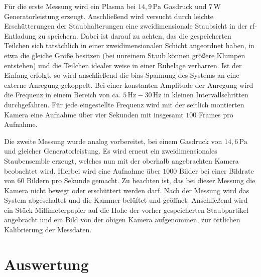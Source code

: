 \documentclass[numbers=noenddot,a4paper,notitlepage,twoside,BCOR15mm]{scrartcl}
\begin{document}
	Für die erste Messung wird ein Plasma bei $14,9\,\mathrm{Pa}$ Gasdruck und $7\,\mathrm{W}$ Generatorleistung erzeugt. Anschließend wird versucht durch leichte Erschütterungen der Staubhalterungen eine zweidimensionale Staubsicht in der rf-Entladung zu speichern. Dabei ist darauf zu achten, das die gespeicherten Teilchen sich tatsächlich in einer zweidimensionalen Schicht angeordnet haben, in etwa die gleiche Größe besitzen (bei unreinem Staub können größere Klumpen entstehen) und die Teilchen idealer weise in einer Ruhelage verharren. Ist der Einfang erfolgt, so wird anschließend die bias-Spannung des Systems an eine externe Anregung gekoppelt. Bei einer konstanten Amplitude der Anregung wird die Frequenz in einem Bereich von ca. $5\,\mathrm{Hz} - 30\,\mathrm{Hz}$ in kleinen Intervallschritten durchgefahren. Für jede eingestellte Frequenz wird mit der seitlich montierten Kamera eine Aufnahme über vier Sekunden mit insgesamt $100$ Frames pro Aufnahme. 
	
	Die zweite Messung wurde analog vorbereitet, bei einem Gasdruck von $14,6\,\mathrm{Pa}$ und gleicher Generatorleistung. Es wird erneut ein zweidimensionales Staubensemble erzeugt, welches nun mit der oberhalb angebrachten Kamera beobachtet wird. Hierbei wird eine Aufnahme über $1000$ Bilder bei einer Bildrate von $60$ Bildern pro Sekunde gemacht. Zu beachten ist, das bei dieser Messung die Kamera nicht bewegt oder erschüttert werden darf. Nach der Messung wird das System abgeschaltet und die Kammer belüftet und geöffnet. Anschließend wird ein Stück Millimeterpapier auf die Hohe der vorher gespeicherten Staubpartikel angebracht und ein Bild von der obigen Kamera aufgenommen, zur örtlichen Kalibrierung der Messdaten.

	\newpage
	\section{Auswertung}
\end{document}
